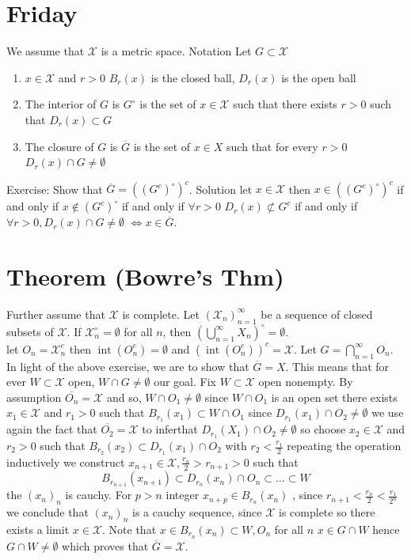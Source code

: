 \documentclass[11pt]{article}
\DeclareMathOperator{\iter}{int}
\begin{document}
\section{Friday}
We assume that $ \mathcal{X}$ is a metric space. Notation Let $G \subset \mathcal{X}$
\begin{enumerate}
    \item $x \in \mathcal{X}$ and $r > 0$  $B_r(x)$ is the closed ball, $D_r(x)$ is the open ball
    \item The interior of $G$ is $G^{\circ}$ is the set of $x \in \mathcal{X}$ such that there exists $r >0$ such that  $D_r(x) \subset G$
    \item The closure of $G$ is $\overline{ G}$ is the set of $x \in X$ such that for every  $r > 0$  $D_r(x) \cap G \ne \emptyset$
\end{enumerate}
Exercise:
Show that $\overline{G} = ((G^{c})^{\circ})^{c}$. Solution let $x \in \mathcal{X}$ then $x \in ((G^{c})^{\circ})^{c}$ if and only if $x \not\in (G^{c})^{\circ}$ 
if and only if $\forall r > 0$  $D_r(x) \not\subset G^{c}$ if and only if $\forall r > 0, D_r(x) \cap G \ne \emptyset$  $\iff x \in \overline{ G}$.

\section{Theorem (Bowre's Thm)} 
Further assume that $ \mathcal{X}$ is complete. Let $( \mathcal{X}_n)_{n=1}^{\infty}$ be a sequence of closed subsets of $ \mathcal{X}$.
If $ \mathcal{X}^{\circ}_n = \emptyset$ for all $n$, then $\left(\bigcup_{n=1}^{\infty}X_n\right)^{\circ} = \emptyset$.
\\
let $O_n = \mathcal{X}_n^{c}$ then $\iter(O_n^{c}) = \emptyset$ and $(\iter(O_n^{c}))^{c} = \mathcal{X}$.
Let $G = \bigcap_{n=1}^{\infty}O_n$. In light of the above exercise, we are to show that $\overline{G} = X$. This means that for ever $W \subset \mathcal{X}$ open, $W \cap G \ne \emptyset$ our goal.
Fix  $W \subset \mathcal{X}$ open nonempty. By assumption $\overline{O_n} = \mathcal{X}$ and so, $W \cap O_1 \ne \emptyset$ since $W \cap O_1$ is an open set there exists $x_1 \in \mathcal{X}$ and $r_1 > 0$ such that
$B_{r_1}(x_1) \subset W \cap O_1$ since $D_{r_1}(x_1) \cap O_2 \ne \emptyset$ we use again the fact that $\overline{O_2} = \mathcal{X}$  to inferthat $D_{r_1}(X_1) \cap O_2 \ne \emptyset$ so choose $x_2 \in \mathcal{X}$ and $r_2 > 0$
such that $B_{r_2}(x_2) \subset D_{r_1}(x_1) \cap O_2$ with $r_2 < \frac{r_1}{2}$ repeating the operation inductively we construct $x_{n+1} \in \mathcal{X}, \frac{r_n}{2} > r_{n+1} > 0$ such that
\[
    B_{r_{n+1}}(x_{n+1}) \subset D_{r_n}(x_n) \cap O_n \subset \dots \subset W 
\] 
the $(x_n)_n$ is cauchy. For $p > n$ integer  $x_{n+p} \in B_{r_n}(x_n)$ , since  $r_{n+1} < \frac{r_n}{2} < \frac{r_1}{2^{n}}$ we conclude that $(x_n)_n$ is a cauchy sequence, since $ \mathcal{X}$ is complete so there exists a limit $x \in \mathcal{X}$.
Note that $x \in B_{r_n}(x_n) \subset W, O_n$ for all  $n$ $x \in G \cap W$ hence $G \cap W \ne \emptyset$ which proves that  $\overline{ G} = \mathcal{X}$.
\end{document}
